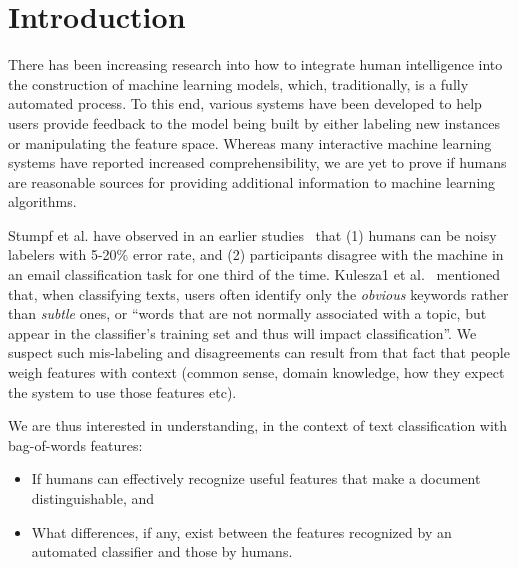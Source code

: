 \section{Introduction}


There has been increasing research into how to integrate human intelligence into the construction of machine learning models, which, traditionally, is a fully automated process. To this end, various systems have been developed to help users provide feedback to the model being built by either labeling new instances or manipulating the feature space. Whereas many interactive machine learning systems have reported increased comprehensibility, we are yet to prove if humans are reasonable sources for providing additional information to machine learning algorithms.

Stumpf et al. have observed in an earlier studies~\cite{stumpf2009interacting} that (1) humans can be noisy labelers with 5-20\% error rate, and (2) participants disagree with the machine in an email classification task for one third of the time. Kulesza1 et al.~\cite{kulesza2015principles} mentioned that, when classifying texts, users often identify only the \emph{obvious} keywords rather than \emph{subtle} ones, or ``words that are not normally associated with a topic, but appear in the classifier's training set and thus will impact classification''. We suspect such mis-labeling and disagreements can result from that fact that people weigh features with context (common sense, domain knowledge, how they expect the system to use those features etc).

We are thus interested in understanding, in the context of text classification with bag-of-words features:
\begin{itemize}
\item If humans can effectively recognize useful features that make a document distinguishable, and 
\item What differences, if any, exist between the features recognized by an automated classifier and those by humans.
\end{itemize}